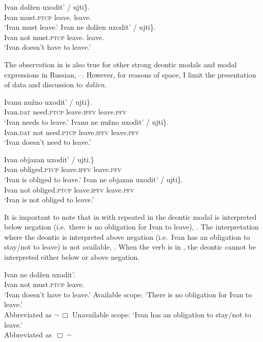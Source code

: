 \documentclass[output=paper,
modfonts,
newtxmath,colorlinks,citecolor=brown
]{langscibook}
\begin{document}
\ea	\label{ar} \ea \gll Ivan dolžen \minsp{\{} uxodit' / ujti\}.\\
	Ivan must.\textsc{ptcp} {} {leave.\im} {} leave.\p {}\\
	\glt `Ivan must leave.' \label{arpos}
	\ex  \gll Ivan ne dolžen \minsp{\{} uxodit' / \minsp{*} ujti\}.\\
    Ivan  not must.\textsc{ptcp} {} {leave.\im} {} {} leave.\p {}\\
	\glt `Ivan doesn't have to leave.' \\ \label{arneg}
	\z \z

\noindent The observation in  is also true for other strong deontic modals and modal expressions in Russian, --. However, for reasons of space, I limit the presentation of  data and discussion to \textit{dolžen}.  

\ea \label{nuzhno}	\ea \gll Ivanu nu\v zno \minsp{\{} uxodit' / ujti\}.\\
	Ivan.\textsc{dat} need.\textsc{ptcp} {} leave.\textsc{ipfv} {} leave.\textsc{pfv} {} \\
    \glt `Ivan needs to leave.'
	\ex \gll Ivanu ne nu\v zno \minsp{\{} uxodit' / \minsp{*} ujti\}. \\
	Ivan.\textsc{dat} not need.\textsc{ptcp} {} leave.\textsc{ipfv} {} {}  leave.\textsc{pfv} {}  \\
    \glt `Ivan doesn't need to leave.'
	\z \z 

\ea \label{objazan}	\ea \gll Ivan objazan  uxodit' / ujti.\}\\
	Ivan obliged.\textsc{ptcp} {} leave.\textsc{ipfv} {} leave.\textsc{pfv} {} \\
	\glt `Ivan is obliged to leave.' 
	\ex \gll Ivan ne objazan \minsp{\{} uxodit' / \minsp{*} ujti\}. \\
	Ivan not obliged.\textsc{ptcp} {} leave.\textsc{ipfv} {} {} leave.\textsc{pfv} {} \\
	\glt `Ivan is not obliged to leave.' 
	\z \z 

\noindent It is important to note that in  with \im repeated in  the deontic modal is interpreted below negation (i.e.\ there is no obligation for Ivan to leave), . The interpretation where the deontic is interpreted above negation (i.e.\ Ivan has an obligation to stay/not to leave) is not available, . When the verb is \p in , the deontic cannot be interpreted either below or above negation. 

\ea \label{arigen} \ea  \gll Ivan ne dolžen uxodit'.\\
    Ivan  not must.\textsc{ptcp} {leave.\im} \\
	\glt `Ivan doesn't have to leave.' \label{ari}
	\ex Available scope: `There is no obligation for Ivan to leave.'\\
    Abbreviated as  $\neg\ \Box$ \im \label{arinegm}
    \ex Unavailable scope: `Ivan has an obligation to stay/not to leave.'\\ 
     Abbreviated as  $\,\Box\ \neg$ \im \label{arimneg}
  	\z \z
\end{document}
